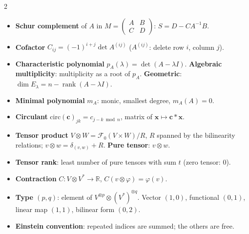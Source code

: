 \documentclass[10pt]{article}
\DeclareMathOperator{\rank}{rank}
\newcommand{\topic}[1]{\par\smallskip\noindent{\color{blue!50!black}\textbf{#1}}\par\nopagebreak}
\begin{document}
\begin{multicols}{2}
\topic{Matrices}
\begin{itemize}
    \item \textbf{Schur complement} of $A$ in $M = \begin{pmatrix} A & B \\ C & D \end{pmatrix}$: $S = D - CA^{-1}B$.
    \item \textbf{Cofactor} $C_{ij} = (-1)^{i+j}\det A^{(ij)}$ ($A^{(ij)}$: delete row $i$, column $j$).
    \item \textbf{Characteristic polynomial} $p_A(\lambda) = \det(A - \lambda I)$. \textbf{Algebraic multiplicity}: multiplicity as a root of $p_A$. \textbf{Geometric}: $\dim E_\lambda = n - \rank(A - \lambda I)$.
    \item \textbf{Minimal polynomial} $m_A$: monic, smallest degree, $m_A(A) = 0$.
    \item \textbf{Circulant} $\mathrm{circ}(\mathbf{c})_{jk} = c_{j - k \bmod n}$, matrix of $\mathbf{x} \mapsto \mathbf{c} \ast \mathbf{x}$.
\end{itemize}

\topic{Tensors}
\begin{itemize}
    \item \textbf{Tensor product} $V \otimes W = \mathcal{F}_0(V \times W)/R$, $R$ spanned by the bilinearity relations; $v \otimes w = \delta_{(v,w)} + R$. \textbf{Pure tensor}: $v \otimes w$.
    \item \textbf{Tensor rank}: least number of pure tensors with sum $t$ (zero tensor: $0$).
    \item \textbf{Contraction} $C: V \otimes V^* \to \mathbb{R}$, $C(v \otimes \varphi) = \varphi(v)$.
    \item \textbf{Type $(p, q)$}: element of $V^{\otimes p} \otimes (V^*)^{\otimes q}$. Vector $(1,0)$, functional $(0,1)$, linear map $(1,1)$, bilinear form $(0,2)$.
    \item \textbf{Einstein convention}: repeated indices are summed; the others are free.
\end{itemize}


\end{multicols}
\end{document}
